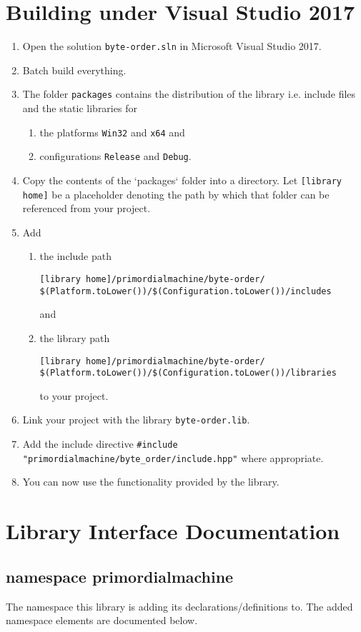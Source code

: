 \documentclass[oneside]{article}
\begin{document}
\section{Building under Visual Studio 2017}
\begin{enumerate}
\item Open the solution \verb+byte-order.sln+ in Microsoft Visual Studio 2017.
\item Batch build everything.
\item The folder \verb+packages+ contains the distribution of the library i.e. include files and the
      static libraries for
  \begin{enumerate}
    \item the platforms \verb+Win32+ and \verb+x64+ and
    \item configurations \verb+Release+ and \verb+Debug+.
  \end{enumerate}
\item Copy the contents of the `packages` folder into a directory. Let
      \verb+[library home]+ be a placeholder denoting the path by which that folder
      can be referenced from your project. 
\item Add
  \begin{enumerate}
    \item the include path
\begin{verbatim}
[library home]/primordialmachine/byte-order/
$(Platform.toLower())/$(Configuration.toLower())/includes
\end{verbatim}
	and
    \item the library path
\begin{verbatim}
[library home]/primordialmachine/byte-order/
$(Platform.toLower())/$(Configuration.toLower())/libraries
\end{verbatim}
    to your project.
\end{enumerate}
\item Link your project with the library \verb+byte-order.lib+.
\item Add the include directive \lstinline{#include "primordialmachine/byte_order/include.hpp"} where appropriate.
\item You can now use the functionality provided by the library.
\end{enumerate}

\section{Library Interface Documentation}
\subsection{namespace primordialmachine}
The namespace this library is adding its declarations/definitions to.
The added namespace elements are documented below.
\end{document}
